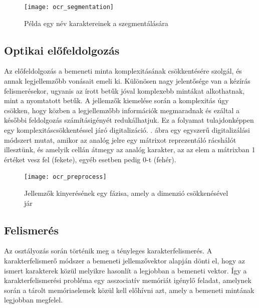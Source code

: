 \begin{figure}
\centering
\texttt{[image: ocr\_segmentation]}
\caption{Példa egy név karaktereinek a szegmentálására}
\label{fig:ocr_segmentation}
\end{figure}

\subsection{Optikai előfeldolgozás}

Az előfeldolgozás a bemeneti minta komplexitásának csökkentésére szolgál, és annak legjellemzőbb vonásait emeli ki. Különösen nagy jelentősége van a kézírás felismerésekor, ugyanis az írott betűk jóval komplexebb mintákat alkothatnak, mint a nyomtatott betűk. A jellemzők kiemelése során a komplexitás úgy csökken, hogy közben a legjellemzőbb információk megmaradnak és ezáltal a későbbi feldolgozás számításigényét redukálhatjuk. Ez a folyamat tulajdonképpen egy komplexitáscsökkentéssel járó digitalizáció. . ábra egy egyszerű digitalizálási módszert mutat, amikor az analóg jelre egy mátrixot reprezentáló rácshálót illesztünk, és amelyik cellán átmegy az analóg karakter, az az elem a mátrixban 1 értéket vesz fel (fekete), egyéb esetben pedig 0-t (fehér).

\begin{figure}
\centering
\texttt{[image: ocr\_preprocess]}
\caption{Jellemzők kinyerésének egy fázisa, amely a dimenzió csökkenésével jár}
\label{fig:ocr_preprocess}
\end{figure}

\subsection{Felismerés}

Az osztályozás során történik meg a tényleges karakterfelismerés. A karakterfelismerő módszer a bemeneti jellemzővektor alapján dönti el, hogy az ismert karakterek közül melyikre hasonlít a legjobban a bemeneti vektor. Így a karakterfelismerési probléma egy asszociatív memóriát igénylő feladat, amelynek során a tárolt memóriaelemek közül kell előhívni azt, amely a bemeneti mintának legjobban megfelel.\\

